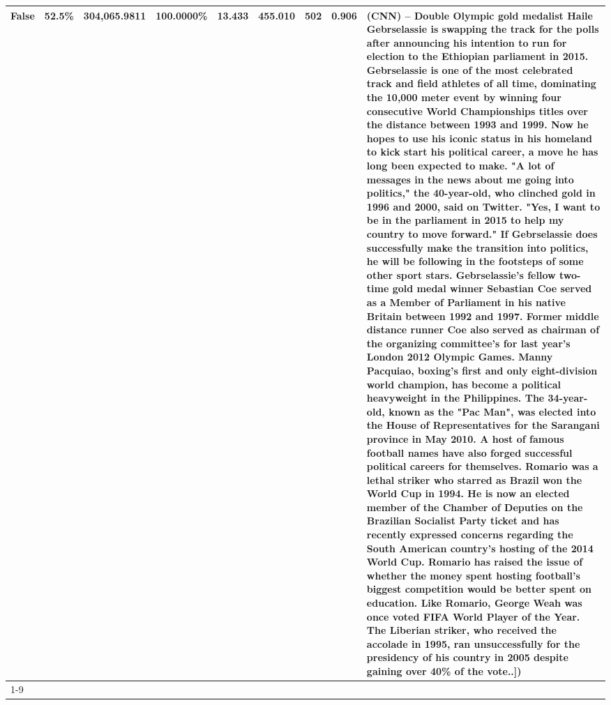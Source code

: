 \begin{table}[H]
{\begin{tabular}{lllrlllll}
False & 52.5\% & 304,065.9811 & \bfseries \color{red} 100.0000\% & 13.433 & 455.010 & 502 & 0.906 & (CNN) -- Double Olympic gold medalist Haile Gebrselassie is swapping the track for the polls after announcing his intention to run for election to the Ethiopian parliament in 2015. Gebrselassie is one of the most celebrated track and field athletes of all time, dominating the 10,000 meter event by winning four consecutive World Championships titles over the distance between 1993 and 1999. Now he hopes to use his iconic status in his homeland to kick start his political career, a move he has long been expected to make. "A lot of messages in the news about me going into politics," the 40-year-old, who clinched gold in 1996 and 2000, said on Twitter. "Yes, I want to be in the parliament in 2015 to help my country to move forward." If Gebrselassie does successfully make the transition into politics, he will be following in the footsteps of some other sport stars. Gebrselassie's fellow two-time gold medal winner Sebastian Coe served as a Member of Parliament in his native Britain between 1992 and 1997. Former middle distance runner Coe also served as chairman of the organizing committee's for last year's London 2012 Olympic Games. Manny Pacquiao, boxing's first and only eight-division world champion, has become a political heavyweight in the Philippines. The 34-year-old, known as the "Pac Man", was elected into the House of Representatives for the Sarangani province in May 2010. A host of famous football names have also forged successful political careers for themselves. Romario was a lethal striker who starred as Brazil won the World Cup in 1994. He is now an elected member of the Chamber of Deputies on the Brazilian Socialist Party ticket and has recently expressed concerns regarding the South American country's hosting of the 2014 World Cup. Romario has raised the issue of whether the money spent hosting football's biggest competition would be better spent on education. Like Romario, George Weah was once voted FIFA World Player of the Year. The Liberian striker, who received the accolade in 1995, ran unsuccessfully for the presidency of his country in 2005 despite gaining over 40\% of the vote..]) \\
\cline{1-9}

\end{tabular}}
\end{table}
